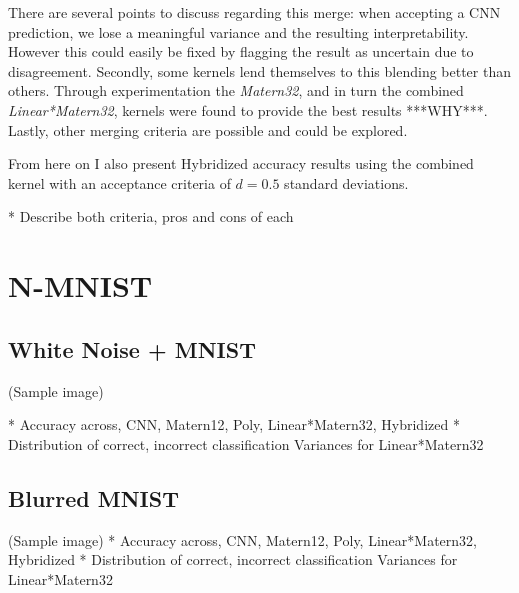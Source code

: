 \documentclass{article}
\begin{document}
There are several points to discuss regarding this merge: when accepting a CNN prediction, we lose a meaningful variance and the resulting interpretability. However this could easily be fixed by flagging the result as uncertain due to disagreement. Secondly, some kernels lend themselves to this blending better than others. Through experimentation the \textit{Matern32}, and in turn the combined \textit{Linear*Matern32}, kernels were found to provide the best results ***WHY***. Lastly, other merging criteria are possible and could be explored.  %

From here on I also present Hybridized accuracy results using the combined kernel with an acceptance criteria of $d=0.5$ standard deviations. %



* Describe both criteria, pros and cons of each



\section{N-MNIST}

\subsection{White Noise + MNIST}
 (Sample image) 
 
* Accuracy across, CNN, Matern12, Poly, Linear*Matern32, Hybridized
* Distribution of correct, incorrect classification Variances for Linear*Matern32

\subsection{Blurred MNIST}
 (Sample image)
* Accuracy across, CNN, Matern12, Poly, Linear*Matern32, Hybridized
* Distribution of correct, incorrect classification Variances for Linear*Matern32
\end{document}
